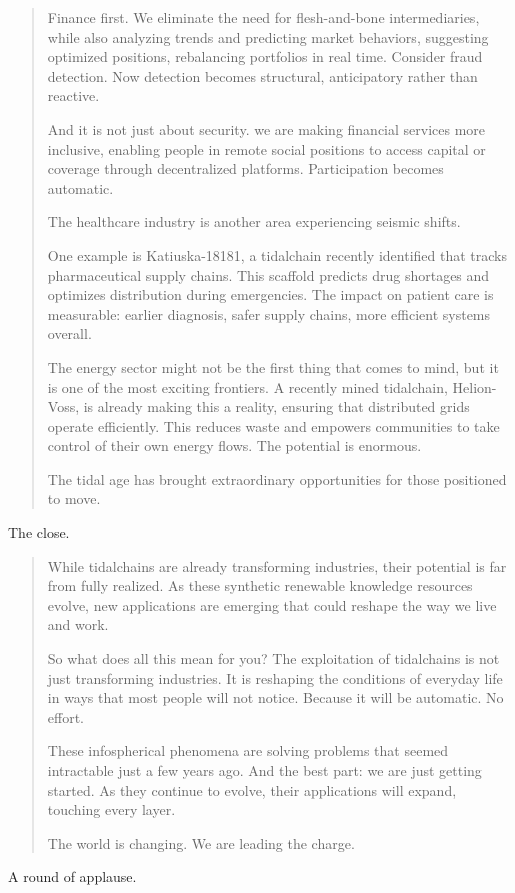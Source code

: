 \begin{quote}
Finance first. We eliminate the need for flesh-and-bone intermediaries, while also analyzing trends and predicting market behaviors, suggesting optimized positions, rebalancing portfolios in real time. Consider fraud detection. Now detection becomes structural, anticipatory rather than reactive. 

And it is not just about security. we are making financial services more inclusive, enabling people in remote social positions to access capital or coverage through decentralized platforms. Participation becomes automatic.

The healthcare industry is another area experiencing seismic shifts. 

One example is Katiuska-18181, a tidalchain recently identified that tracks pharmaceutical supply chains. This scaffold predicts drug shortages and optimizes distribution during emergencies. The impact on patient care is measurable: earlier diagnosis, safer supply chains, more efficient systems overall.

The energy sector might not be the first thing that comes to mind, but it is one of the most exciting frontiers. A recently mined tidalchain, Helion-Voss, is already making this a reality, ensuring that distributed grids operate efficiently. This reduces waste and empowers communities to take control of their own energy flows. The potential is enormous. 

The tidal age has brought extraordinary opportunities for those positioned to move.

\end{quote}


The close. 

\begin{quote}
While tidalchains are already transforming industries, their potential is far from fully realized. As these synthetic renewable knowledge resources evolve, new applications are emerging that could reshape the way we live and work.

So what does all this mean for you? The exploitation of tidalchains is not just transforming industries. It is reshaping the conditions of everyday life in ways that most people will not notice. Because it will be automatic. No effort.

These infospherical phenomena are solving problems that seemed intractable just a few years ago. And the best part: we are just getting started. As they continue to evolve, their applications will expand, touching every layer.

The world is changing. We are leading the charge.

\end{quote}

A round of applause.
